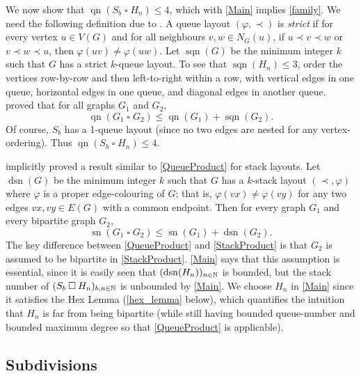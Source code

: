 \documentclass[kpfonts]{patmorin}
\DeclareMathOperator{\sn}{sn}
\DeclareMathOperator{\qn}{qn}
\DeclareMathOperator{\sqn}{sqn}
\DeclareMathOperator{\dsn}{dsn}
\renewcommand{\leq}{\leqslant}
\newcommand{\CartProd}{\mathbin{\square}}
\begin{document}
We now show that $\qn(S_b\CartProd H_n)\leq 4$, which with \cref{Main} implies \cref{family}. We need the following definition due to \citet{Wood-Queue-DMTCS05}. A queue layout $(\varphi,\prec)$ is \emph{strict} if for every vertex $u\in V(G)$ and for all neighbours $v,w\in N_G(u)$, if $u\prec v\prec w$ or $v\prec w \prec u$, then $\varphi(uv)\neq \varphi(uw)$. Let $\sqn(G)$ be the minimum integer $k$ such that $G$ has a strict $k$-queue layout. To see that $\sqn(H_n) \leq 3$, order the vertices row-by-row and then left-to-right within a row, with vertical edges in one queue, horizontal edges in one queue, and diagonal edges in another queue. \citet{Wood-Queue-DMTCS05} proved that for all graphs $G_1$ and $G_2$,
\begin{equation}
\label{QueueProduct}
\qn(G_1 \CartProd G_2) \leq \qn(G_1) + \sqn(G_2).
\end{equation}
Of course, $S_b$ has a 1-queue layout (since no two edges are nested for any vertex-ordering). Thus $\qn(S_b \CartProd H_n)\leq 4$.

\citet{BK79} implicitly proved a result similar to \cref{QueueProduct} for stack layouts. Let $\dsn(G)$ be the minimum integer $k$ such that $G$ has a $k$-stack layout $(\prec,\varphi)$ where $\varphi$ is a proper edge-colouring of $G$; that is, $\varphi(vx)\neq\varphi(vy)$ for any two edges $vx,vy\in E(G)$ with a common endpoint. Then for every graph $G_1$ and every bipartite graph $G_2$,
\begin{equation}
\label{StackProduct}
\sn(G_1 \CartProd G_2) \leq \sn(G_1) + \dsn(G_2).
\end{equation}
The key difference between \cref{QueueProduct} and \cref{StackProduct} is that $G_2$ is assumed to be bipartite in \cref{StackProduct}. \cref{Main} says that this assumption is essential, since it is easily seen that $(\dsn(H_n))_{n\in\N}$ is bounded, but the stack number of $(S_b \CartProd H_n)_{b,n\in\N}$ is unbounded by \cref{Main}. We choose $H_n$ in \cref{Main} since it satisfies the Hex Lemma (\cref{hex_lemma} below), which quantifies the intuition that $H_n$ is far from being bipartite (while still having bounded queue-number and bounded maximum degree so that \cref{QueueProduct} is applicable). 


\subsection*{Subdivisions}
\end{document}
